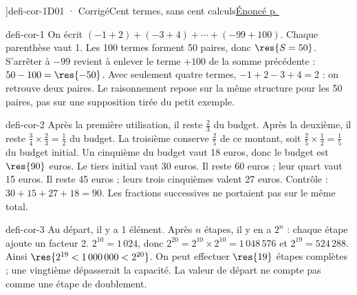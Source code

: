 \editionPage[\pdfbookmark[0]{Corrigés des défis}{bm-defi-cor-1-parent}]{defi-cor-1}{D01 · Corrigé}{Cent termes, sans cent calculs}{\hyperref[defi-ex-1]{Énoncé p.\,\pageref*{defi-ex-1}}}
\begin{blocEdition}{defi-cor-1}
On écrit $(-1+2)+(-3+4)+\cdots+(-99+100)$. Chaque parenthèse vaut 1. Les 100 termes forment 50 paires, donc $\res{S=50}$.
S’arrêter à $-99$ revient à enlever le terme $+100$ de la somme précédente : $50-100=\res{-50}$.
Avec seulement quatre termes, $-1+2-3+4=2$ : on retrouve deux paires. Le raisonnement repose sur la même structure pour les 50 paires, pas sur une supposition tirée du petit exemple.
\end{blocEdition}
\begin{blocEdition}{defi-cor-2}
Après la première utilisation, il reste $\frac23$ du budget. Après la deuxième, il reste $\frac34\times\frac23=\frac12$ du budget. La troisième conserve $\frac25$ de ce montant, soit $\frac25\times\frac12=\frac15$ du budget initial.
Un cinquième du budget vaut 18 euros, donc le budget est $\res{90}$ euros.
Le tiers initial vaut 30 euros. Il reste 60 euros ; leur quart vaut 15 euros. Il reste 45 euros ; leurs trois cinquièmes valent 27 euros. Contrôle : $30+15+27+18=90$. Les fractions successives ne portaient pas sur le même total.
\end{blocEdition}
\begin{blocEdition}{defi-cor-3}
Au départ, il y a 1 élément. Après $n$ étapes, il y en a $2^n$ : chaque étape ajoute un facteur 2.
$2^{10}=1\,024$, donc $2^{20}=2^{10}\times2^{10}=1\,048\,576$ et $2^{19}=524\,288$. Ainsi $\res{2^{19}<1\,000\,000<2^{20}}$.
On peut effectuer $\res{19}$ étapes complètes ; une vingtième dépasserait la capacité. La valeur de départ ne compte pas comme une étape de doublement.
\end{blocEdition}
